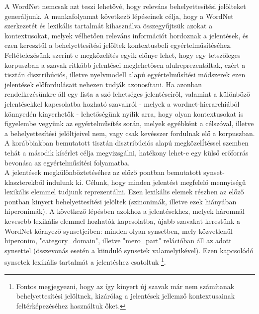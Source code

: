 \documentclass{llncs}
\begin{document}
A WordNet nemcsak azt teszi lehet\H{o}v\'{e}, hogy relev\'{a}ns behelyettes\'{i}t\'{e}si jel\"{o}lteket gener\'{a}ljunk. A munkafolyamat k\"{o}vetkez\H{o} l\'{e}p\'{e}seinek c\'{e}lja, hogy a WordNet szerkezet\'{e}t \'{e}s lexik\'{a}lis tartalm\'{a}t kihaszn\'{a}lva \"{o}sszegy\H{u}jts\"{u}k azokat a kontextusokat, melyek v\'{e}lhet\H{o}en relev\'{a}ns inform\'{a}ci\'{o}t hordoznak a jelent\'{e}sek, \'{e}s ezen kereszt\"{u}l a behelyettes\'{i}t\'{e}si jel\"{o}ltek kontextusbeli egy\'{e}rtelm\H{u}s\'{i}t\'{e}s\'{e}hez. Felt\'{e}telez\'{e}s\"{u}nk szerint e megk\"{o}zel\'{i}t\'{e}s egyik el\H{o}nye lehet, hogy egy tetsz\H{o}leges korpuszban a szavak ritk\'{a}bb jelent\'{e}sei meglehet\H{o}sen alulreprezent\'{a}ltak, ez\'{e}rt a tiszt\'{a}n disztrib\'{u}ci\'{o}s, illetve nyelvmodell alap\'{u} egy\'{e}rtelm\H{u}s\'{i}t\'{e}si m\'{o}dszerek ezen jelent\'{e}sek el\H{o}fordul\'{a}sait nehezen tudj\'{a}k azonos\'{i}tani. Ha azonban rendelkez\'{e}s\"{u}nkre \'{a}ll egy lista a sz\'{o} lehets\'{e}ges jelent\'{e}seir\H{o}l, valamint a k\"{u}l\"{o}nb\"{o}z\H{o} jelent\'{e}sekkel kapcsolatba hozhat\'{o} szavakr\'{o}l - melyek a wordnet-hierarchi\'{a}b\'{o}l k\"{o}nnyed\'{e}n kinyerhet\H{o}k - lehet\H{o}s\'{e}g\"{u}nk ny\'{i}lik arra, hogy olyan kontextusokat is figyelembe vegy\"{u}nk az egy\'{e}rtelm\H{u}s\'{i}t\'{e}s sor\'{a}n, melyek egy\'{e}bk\'{e}nt a c\'{e}lsz\'{o}val, illetve a behelyettes\'{i}t\'{e}si jel\"{o}ltjeivel nem, vagy csak kev\'{e}sszer fordulnak el\H{o} a korpuszban. A kor\'{a}bbiakban bemutatott tiszt\'{a}n disztrib\'{u}ci\'{o}s alap\'{u} megk\"{o}zel\'{I}t\'{e}ssel szemben teh\'{a}t a m\'{a}sodik k\'{i}s\'{e}rlet c\'{e}lja megvizsg\'{a}lni, hat\'{e}kony lehet-e egy k\"{u}ls\H{o} er\H{o}forr\'{a}s bevon\'{a}sa az egy\'{e}rtelm\H{u}s\'{i}t\'{e}si folyamatba. \\

A jelent\'{e}sek megk\"{u}l\"{o}nb\"{o}ztet\'{e}s\'{e}hez az el\H{o}z\H{o} pontban bemutatott synset-klaszterekb\H{o}l indulunk ki.  C\'{e}lunk, hogy minden jelent\'{e}st megfelel\H{o} mennyis\'{e}g\H{u} lexik\'{a}lis elemmel tudjunk reprezent\'{a}lni. Ezen lexik\'{a}lis elemek r\'{e}szben az el\H{o}z\H{o} pontban kinyert behelyettes\'{i}t\'{e}si jel\"{o}ltek (szinonim\'{a}k, illetve ezek hi\'{a}ny\'{a}ban hiperonim\'{a}k). A k\"{o}vetkez\H{o} l\'{e}p\'{e}sben azokhoz a jelent\'{e}sekhez, melyek h\'{a}romn\'{a}l kevesebb lexik\'{a}lis elemmel hozhat\'{o}k kapcsolatba, \'{u}jabb szavakat kerest\"{u}nk a WordNet k\"{o}rnyez\H{o} synsetjeiben: minden olyan synsetben, mely k\"{o}zvetlen\"{u}l hiperonim, "category\_domain", illetve "mero\_part" rel\'{a}ci\'{o}ban \'{a}ll az adott synsettel (\"{o}sszevon\'{a}s eset\'{e}n a kiindul\'{o} synsetek valamelyik\'{e}vel). Ezen kapcsol\'{o}d\'{o} synsetek lexik\'{a}lis tartalm\'{a}t a jelent\'{e}shez csatoltuk \footnote{Fontos megjegyezni, hogy az \'{i}gy kinyert \'{u}j szavak m\'{a}r nem sz\'{a}m\'{i}tanak behelyettes\'{i}t\'{e}si jel\"{o}ltnek, kiz\'{a}r\'{o}lag a jelent\'{e}sek jellemz\H{o} kontextusainak felt\'{e}rk\'{e}pez\'{e}s\'{e}hez haszn\'{a}ltuk \H{o}ket.}.\\
\end{document}
